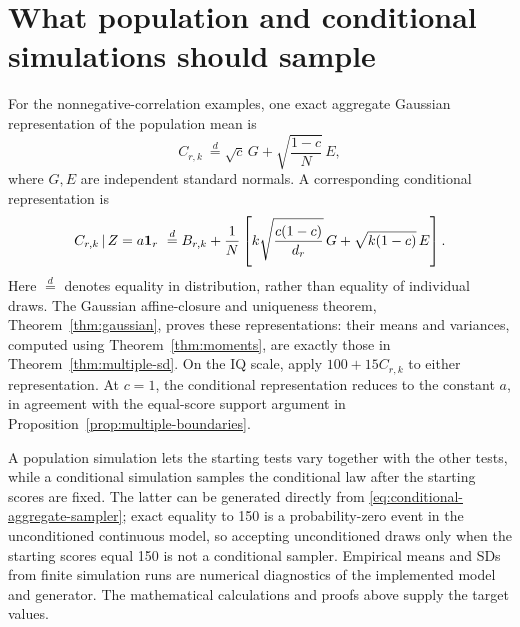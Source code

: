 \section{What population and conditional simulations should sample}
For the nonnegative-correlation examples, one exact aggregate Gaussian
representation of the population mean is
\begin{equation}
 C_{r,k}\ \stackrel{d}{=}
 \sqrt c\,G+\sqrt{\frac{1-c}{N}}\,E,
 \label{eq:population-aggregate-sampler}
\end{equation}
where \(G,E\) are independent standard normals. A corresponding
conditional representation is
\begin{equation}
 C_{r,k}\given Z=a\one_r\ \stackrel{d}{=}
 B_{r,k}+\frac1N\left[
   k\sqrt{\frac{c(1-c)}{d_r}}\,G+
   \sqrt{k(1-c)}\,E\right].
 \label{eq:conditional-aggregate-sampler}
\end{equation}
Here \(\stackrel{d}{=}\) denotes equality in distribution, rather than
equality of individual draws. The Gaussian affine-closure and uniqueness
theorem, Theorem~\ref{thm:gaussian}, proves these representations: their
means and variances, computed using Theorem~\ref{thm:moments}, are exactly
those in Theorem~\ref{thm:multiple-sd}. On the IQ scale, apply
\(100+15C_{r,k}\) to either representation.
At \(c=1\), the conditional representation reduces to the constant
\(a\), in agreement with the equal-score support argument in
Proposition~\ref{prop:multiple-boundaries}.

A population simulation lets the starting tests vary together with the
other tests, while a conditional simulation samples the conditional law
after the starting scores are fixed. The latter can be generated directly
from \eqref{eq:conditional-aggregate-sampler}; exact equality to 150 is a
probability-zero event in the unconditioned continuous model, so accepting
unconditioned draws only when the starting scores equal 150 is not a
conditional sampler. Empirical means and SDs from finite simulation runs
are numerical diagnostics of the implemented model and generator. The
mathematical calculations and proofs above supply the target values.
